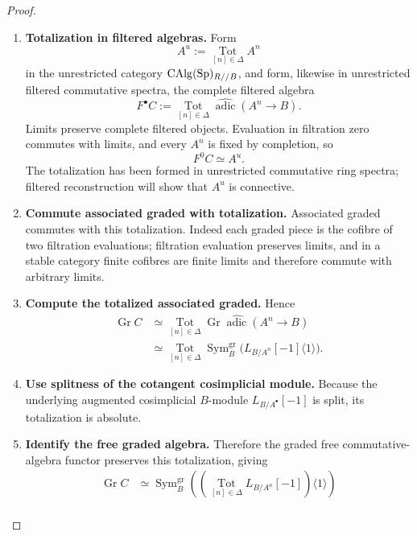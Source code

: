 \begin{proof}
\begin{enumerate}[label=\textup{(\arabic*)}]
\[        \operatorname*{Tot}_{[n]\in\Delta}
        L_{B/A^n}[-1].
    \]
    \item \textbf{Totalization in filtered algebras.}
    Form
    \[
        A^u:=\operatorname*{Tot}_{[n]\in\Delta}A^n
    \]
    in the unrestricted category \(\operatorname{CAlg}(\operatorname{Sp})_{R//B}\), and form, likewise in
    unrestricted filtered commutative spectra, the complete filtered algebra
    \[
        F^\bullet C
        :=
        \operatorname*{Tot}_{[n]\in\Delta}
        \widehat{\operatorname{adic}}(A^n\to B).
    \]
    Limits preserve complete filtered objects. Evaluation in filtration zero
    commutes with limits, and every \(A^n\) is fixed by completion, so
    \[
        F^0C\simeq A^u.
    \]
    The totalization has been formed in unrestricted commutative ring spectra;
    filtered reconstruction will show that \(A^u\) is connective.
    \item \textbf{Commute associated graded with totalization.}
    Associated graded commutes with this totalization. Indeed each graded piece
    is the cofibre of two filtration evaluations; filtration evaluation preserves
    limits, and in a stable category finite cofibres are finite limits and
    therefore commute with arbitrary limits.
    \item \textbf{Compute the totalized associated graded.}
    Hence
    \[
    \begin{aligned}
        \operatorname{Gr}C
        &\simeq
        \operatorname*{Tot}_{[n]\in\Delta}
        \operatorname{Gr}
        \widehat{\operatorname{adic}}(A^n\to B)
        \\
        &\simeq
        \operatorname*{Tot}_{[n]\in\Delta}
        \operatorname{Sym}^{\mathrm{gr}}_B
        \bigl(L_{B/A^n}[-1]\langle1\rangle\bigr).
    \end{aligned}
    \]
    \item \textbf{Use splitness of the cotangent cosimplicial module.}
    Because the underlying augmented cosimplicial \(B\)-module
    \(L_{B/A^\bullet}[-1]\) is split, its totalization is absolute.
    \item \textbf{Identify the free graded algebra.}
    Therefore the
    graded free commutative-algebra functor preserves this totalization, giving
    \[
    \begin{aligned}
        \operatorname{Gr}C
        &\simeq
        \operatorname{Sym}^{\mathrm{gr}}_B
        \left(
            \left(
            \operatorname*{Tot}_{[n]\in\Delta}
            L_{B/A^n}[-1]
            \right)\langle1\rangle
        \right)
        \\

\end{aligned}\]
\end{enumerate}
\end{proof}
